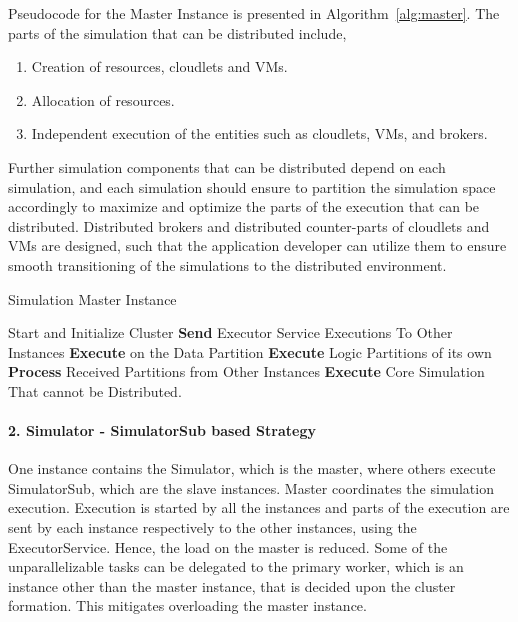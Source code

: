 Pseudocode for the Master Instance is presented in Algorithm~\ref{alg:master}. The parts of the simulation that can be distributed include,
\begin{enumerate}[i]
  \item Creation of resources, cloudlets and VMs.
  \item Allocation of resources.
  \item Independent execution of the entities such as cloudlets, VMs, and brokers.
\end{enumerate}
Further simulation components that can be distributed depend on each simulation, and each simulation should ensure to partition the simulation space accordingly to maximize and optimize the parts of the execution that can be distributed. Distributed brokers and distributed counter-parts of cloudlets and VMs are designed, such that the application developer can utilize them to ensure smooth transitioning of the simulations to the distributed environment.

\begin{algorithm}
  \caption{Simulation Master Instance}
\label{alg:master}
  \begin{algorithmic}
\State Start and Initialize  Cluster
\Repeat
\While{  }
\State \textbf{Send} Executor Service Executions To Other Instances
\State \textbf{Execute} on the Data Partition
\State \textbf{Execute} Logic Partitions of its own
\EndWhile
\State \textbf{Process} Received Partitions from Other Instances
\State \textbf{Execute} Core Simulation That cannot be Distributed.
\Until 
\State 
\State  
  \end{algorithmic}
\end{algorithm}

\paragraph*{2. Simulator - SimulatorSub based Strategy}
One instance contains the Simulator, which is the master, where others execute SimulatorSub, which are the slave instances. Master coordinates the simulation execution. Execution is started by all the instances and parts of the execution are sent by each instance respectively to the other instances, using the ExecutorService. Hence, the load on the master is reduced. Some of the unparallelizable tasks can be delegated to the primary worker, which is an instance other than the master instance, that is decided upon the cluster formation. This mitigates overloading the master instance.

